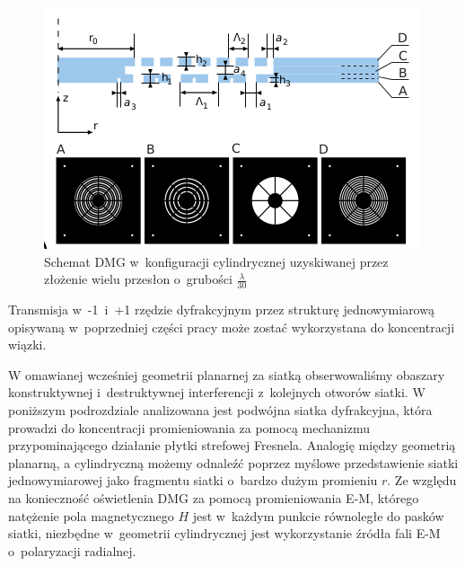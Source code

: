 \begin{figure}
	\includegraphics[width=\textwidth]{images/dmg/express_siatki.png}
	\caption{Schemat DMG w~konfiguracji cylindrycznej uzyskiwanej przez złożenie wielu przesłon o~grubości $\frac{\lambda}{30}$ \cite{Yavorskiy:14}}
	\label{fig:schem-cyl}
\end{figure}

Transmisja w~-1~i~+1 rzędzie dyfrakcyjnym przez strukturę jednowymiarową opisywaną w~poprzedniej części pracy może zostać wykorzystana do koncentracji wiązki. 

W omawianej wcześniej geometrii planarnej za siatką obserwowaliśmy obaszary konstruktywnej i~destruktywnej interferencji z~kolejnych otworów siatki. W poniższym podrozdziale analizowana jest podwójna siatka dyfrakcyjna, która prowadzi do koncentracji promieniowania za pomocą mechanizmu przypominającego działanie płytki strefowej Fresnela. Analogię między geometrią planarną, a cylindryczną możemy odnaleźć poprzez myślowe przedstawienie siatki jednowymiarowej jako fragmentu siatki o~bardzo dużym promieniu $r$. Ze względu na konieczność oświetlenia DMG za pomocą promieniowania E-M, którego natężenie pola magnetycznego $H$ jest w~każdym punkcie równoległe do pasków siatki, niezbędne w~geometrii cylindrycznej jest wykorzystanie źródła fali E-M o~polaryzacji radialnej. 


